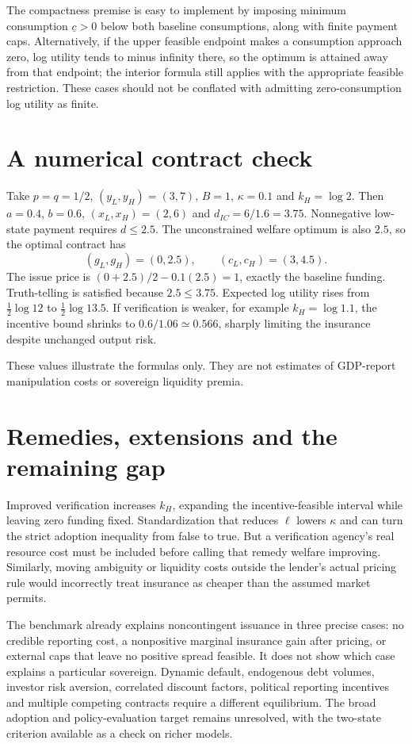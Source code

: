 \documentclass[11pt]{article}
\begin{document}
The compactness premise is easy to implement by imposing minimum consumption $\underline c>0$ below both baseline consumptions, along with finite payment caps. Alternatively, if the upper feasible endpoint makes a consumption approach zero, log utility tends to minus infinity there, so the optimum is attained away from that endpoint; the interior formula still applies with the appropriate feasible restriction. These cases should not be conflated with admitting zero-consumption log utility as finite.

\section*{A numerical contract check}
Take $p=q=1/2$, $(y_L,y_H)=(3,7)$, $B=1$, $\kappa=0.1$ and $k_H=\log2$. Then $a=0.4$, $b=0.6$, $(x_L,x_H)=(2,6)$ and $d_{IC}=6/1.6=3.75$. Nonnegative low-state payment requires $d\leq2.5$. The unconstrained welfare optimum is also $2.5$, so the optimal contract has
\[
 (g_L,g_H)=(0,2.5),\qquad(c_L,c_H)=(3,4.5).
\]
The issue price is $(0+2.5)/2-0.1(2.5)=1$, exactly the baseline funding. Truth-telling is satisfied because $2.5\leq3.75$. Expected log utility rises from $\tfrac12\log12$ to $\tfrac12\log13.5$. If verification is weaker, for example $k_H=\log1.1$, the incentive bound shrinks to $0.6/1.06\simeq0.566$, sharply limiting the insurance despite unchanged output risk.

These values illustrate the formulas only. They are not estimates of GDP-report manipulation costs or sovereign liquidity premia.

\section*{Remedies, extensions and the remaining gap}
Improved verification increases $k_H$, expanding the incentive-feasible interval while leaving zero funding fixed. Standardization that reduces $\ell$ lowers $\kappa$ and can turn the strict adoption inequality from false to true. But a verification agency's real resource cost must be included before calling that remedy welfare improving. Similarly, moving ambiguity or liquidity costs outside the lender's actual pricing rule would incorrectly treat insurance as cheaper than the assumed market permits.

The benchmark already explains noncontingent issuance in three precise cases: no credible reporting cost, a nonpositive marginal insurance gain after pricing, or external caps that leave no positive spread feasible. It does not show which case explains a particular sovereign. Dynamic default, endogenous debt volumes, investor risk aversion, correlated discount factors, political reporting incentives and multiple competing contracts require a different equilibrium. The broad adoption and policy-evaluation target remains unresolved, with the two-state criterion available as a check on richer models.
\end{document}

